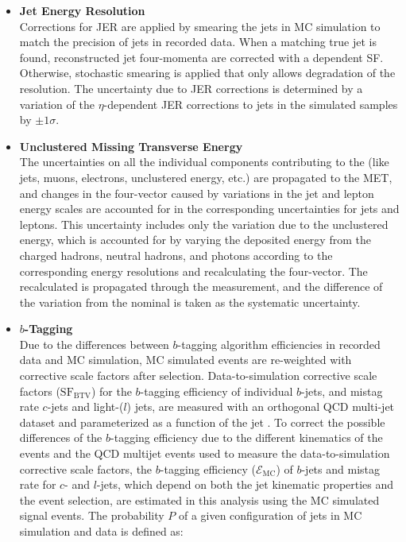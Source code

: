 \begin{refsection}
\begin{itemize}
    \item {\bf Jet Energy Resolution} \\
    Corrections for JER are applied by smearing the jets in MC simulation to match the precision of jets in recorded data.
    When a matching true jet is found, reconstructed jet four-momenta are corrected with a \pT dependent SF.
    Otherwise, stochastic smearing is applied that only allows degradation of the resolution.
    The uncertainty due to JER corrections is determined by a variation of the $\eta$-dependent JER corrections to jets in the simulated samples by $\pm 1\sigma$.
    \item {\bf Unclustered Missing Transverse Energy} \\
    The uncertainties on all the individual components contributing to the \ETmiss (like jets, muons, electrons, unclustered energy, etc.) are propagated to the MET, and changes in the \ETmiss four-vector caused by variations in the jet and lepton energy scales are accounted for in the corresponding uncertainties for jets and leptons.
    This uncertainty includes only the variation due to the unclustered energy, which is accounted for by varying the deposited energy from the charged hadrons, neutral hadrons, and photons according to the corresponding energy resolutions and recalculating the \ETmiss four-vector. 
    The recalculated \ETmiss is propagated through the measurement, and the difference of the variation from the nominal is taken as the systematic uncertainty.
    \item {\bf $b$-Tagging} \\
    Due to the differences between $b$-tagging algorithm efficiencies in recorded data and MC simulation, MC simulated events are re-weighted with corrective scale factors after selection.
    Data-to-simulation corrective scale factors ($\text{SF}_{\text{BTV}}$) for the $b$-tagging efficiency of individual $b$-jets, and mistag rate $c$-jets and light-($l$) jets, are measured with an orthogonal QCD multi-jet dataset and parameterized as a function of the jet \pT.
    To correct the possible differences of the $b$-tagging efficiency due to the different kinematics of the \ttbar events and the QCD multijet events used to measure the data-to-simulation corrective scale factors, the $b$-tagging efficiency ($\mathcal{E}_{\text{MC}}$) of $b$-jets and mistag rate for $c$- and $l$-jets, which depend on both the jet kinematic properties and the event selection, are estimated in this analysis using the MC simulated \ttbar signal events.
    The probability $P$ of a given configuration of jets in MC simulation and data is defined as:

\end{itemize}
\end{refsection}
